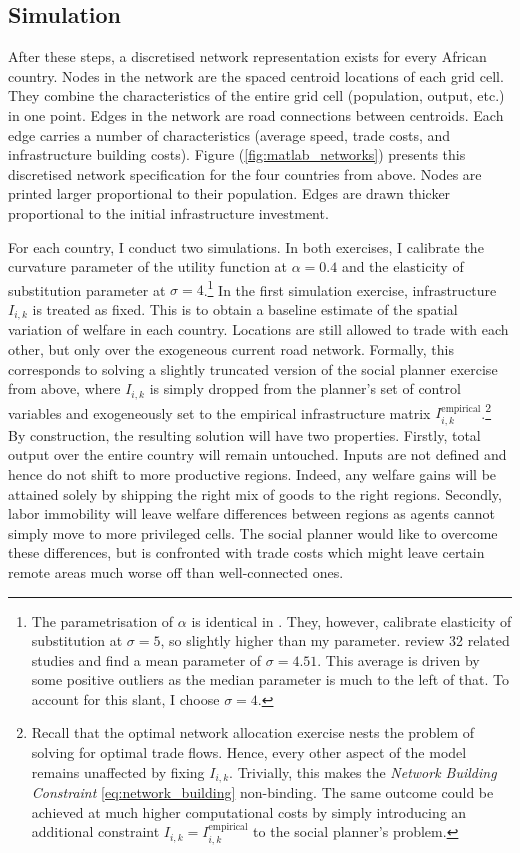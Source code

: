 \documentclass[11pt, oneside]{article}   	%
\let\oldref\ref
\renewcommand{\ref}[1]{(\oldref{#1})}
\begin{document}
\subsection{Simulation}

After these steps, a discretised network representation exists for every African country. Nodes in the network are the spaced centroid locations of each grid cell. They combine the characteristics of the entire grid cell (population, output, etc.) in one point. Edges in the network are road connections between centroids. Each edge carries a number of characteristics (average speed, trade costs, and infrastructure building costs). Figure \ref{fig:matlab_networks} presents this discretised network specification for the four countries from above. Nodes are printed larger proportional to their population. Edges are drawn thicker proportional to the initial infrastructure investment.

For each country, I conduct two simulations. In both exercises, I calibrate the curvature parameter of the utility function at $\alpha = 0.4$ and the elasticity of substitution parameter at $\sigma=4$.\footnote{The parametrisation of $\alpha$ is identical in \cite{fajgelbaum_optimal_2017}. They, however, calibrate elasticity of substitution at $\sigma=5$, so slightly higher than my parameter. \cite{Head_GravityEquationsWorkhorse_2014} review 32 related studies and find a mean parameter of $\sigma=4.51$. This average is driven by some positive outliers as the median parameter is much to the left of that. To account for this slant, I choose $\sigma=4$.} In the first simulation exercise, infrastructure $I_{i,k}$ is treated as fixed. This is to obtain a baseline estimate of the spatial variation of welfare in each country. Locations are still allowed to trade with each other, but only over the exogeneous current road network. Formally, this corresponds to solving a slightly truncated version of the social planner exercise from above, where $I_{i,k}$ is simply dropped from the planner's set of control variables and exogeneously set to the empirical infrastructure matrix $I_{i,k}^{\textrm{empirical}}$.\footnote{Recall that the optimal network allocation exercise nests the problem of solving for optimal trade flows. Hence, every other aspect of the model remains unaffected by fixing $I_{i,k}$. Trivially, this makes the \emph{Network Building Constraint} \eqref{eq:network_building} non-binding. The same outcome could be achieved at much higher computational costs by simply introducing an additional constraint $I_{i,k} = I_{i,k}^{\textrm{empirical}}$ to the social planner's problem.} By construction, the resulting solution will have two properties. Firstly, total output over the entire country will remain untouched. Inputs are not defined and hence do not shift to more productive regions. Indeed, any welfare gains will be attained solely by shipping the right mix of goods to the right regions. Secondly, labor immobility will leave welfare differences between regions as agents cannot simply move to more privileged cells. The social planner would like to overcome these differences, but is confronted with trade costs which might leave certain remote areas much worse off than well-connected ones.
\end{document}
